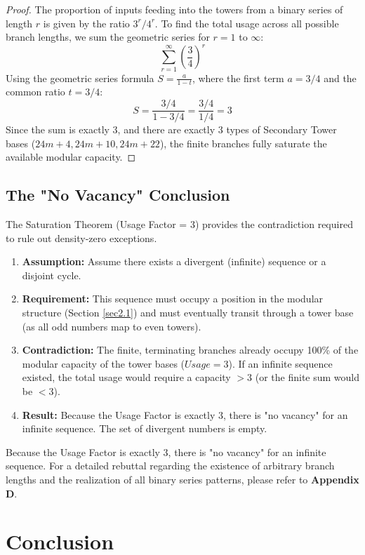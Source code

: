 \documentclass[sn-mathphys-num, pdflatex]{sn-jnl}
\begin{document}
\begin{proof}
The proportion of inputs feeding into the towers from a binary series of length $r$ is given by the ratio $3^r / 4^r$. To find the total usage across all possible branch lengths, we sum the geometric series for $r=1$ to $\infty$:
$$ \sum_{r=1}^{\infty} \left( \frac{3}{4} \right)^r $$
Using the geometric series formula $S = \frac{a}{1-t}$, where the first term $a = 3/4$ and the common ratio $t = 3/4$:
$$ S = \frac{3/4}{1 - 3/4} = \frac{3/4}{1/4} = 3 $$
Since the sum is exactly 3, and there are exactly 3 types of Secondary Tower bases ($24m+4, 24m+10, 24m+22$), the finite branches fully saturate the available modular capacity.
\end{proof}

\subsection{The "No Vacancy" Conclusion}
The Saturation Theorem (Usage Factor = 3) provides the contradiction required to rule out density-zero exceptions.

\begin{enumerate}
    \item \textbf{Assumption:} Assume there exists a divergent (infinite) sequence or a disjoint cycle.
    \item \textbf{Requirement:} This sequence must occupy a position in the modular structure (Section \ref{sec2.1}) and must eventually transit through a tower base (as all odd numbers map to even towers).
    \item \textbf{Contradiction:} The finite, terminating branches already occupy 100\% of the modular capacity of the tower bases ($Usage = 3$). If an infinite sequence existed, the total usage would require a capacity $>3$ (or the finite sum would be $<3$).
    \item \textbf{Result:} Because the Usage Factor is exactly 3, there is "no vacancy" for an infinite sequence. The set of divergent numbers is empty.
\end{enumerate}

Because the Usage Factor is exactly 3, there is "no vacancy" for an infinite sequence. For a detailed rebuttal regarding the existence of arbitrary branch lengths and the realization of all binary series patterns, please refer to \textbf{Appendix D}.

\section{Conclusion}\label{Sec 8}
\end{document}
